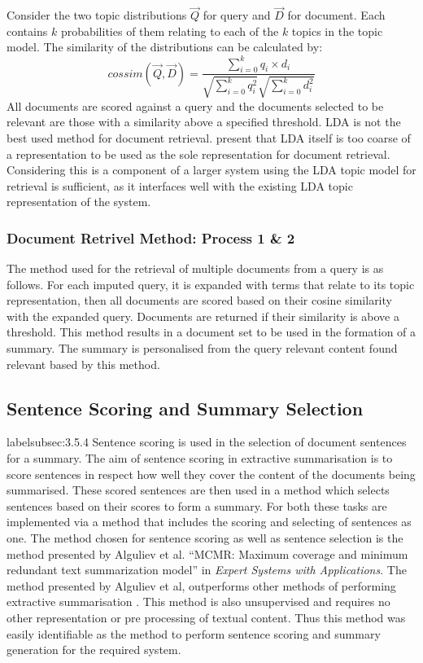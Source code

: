 Consider the two topic distributions $\vec{Q}$ for query and $\vec{D}$ for document. Each contains $k$ probabilities of them relating to each of the $k$ topics in the topic model. The similarity of the distributions can be calculated by:
\begin{equation}
    cossim(\vec{Q}, \vec{D}) = \frac{\sum_{i=0}^k q_i \times d_i}{\sqrt{\sum_{i=0}^k q_i^2}\sqrt{\sum_{i=0}^k d_i^2}}
    \label{cosim}
\end{equation}
All documents are scored against a query and the documents selected to be relevant are those with a similarity above a specified threshold. LDA is not the best used method for document retrieval. \citet{wei2006lda} present that LDA itself is too coarse of a representation to be used as the sole representation for document retrieval. Considering this is a component of a larger system using the LDA topic model for retrieval is sufficient, as it interfaces well with the existing LDA topic representation of the system.

\subsubsection{Document Retrivel Method: Process 1 \& 2}
The method used for the retrieval of multiple documents from a query is as follows. For each imputed query, it is expanded with terms that relate to its topic representation, then all documents are scored based on their cosine similarity with the expanded query. Documents are returned if their similarity is above a threshold. This method results in a document set to be used in the formation of a summary. The summary is personalised from the query relevant content found relevant based by this method. 

\subsection{Sentence Scoring and Summary Selection}
label{subsec:3.5.4}
Sentence scoring is used in the selection of document sentences for a summary. The aim of sentence scoring in extractive summarisation is to score sentences in respect how well they cover the content of the documents being summarised. These scored sentences are then used in a method which selects  sentences based on their scores to form a summary. For both these tasks are implemented via a method that includes the scoring and selecting of sentences as one. The method chosen for sentence scoring as well as sentence selection is the method presented by Alguliev et al. \citeyear{alguliev2011mcmr} “MCMR: Maximum coverage and minimum redundant text summarization model” in \emph{Expert Systems with Applications}. The method presented by Alguliev et al, outperforms other methods of performing extractive summarisation \citep{gambhir2017recent}. This method is also unsupervised and requires no other representation or pre processing of textual content. Thus this method was easily identifiable as the method to perform sentence scoring and summary generation for the required system.

